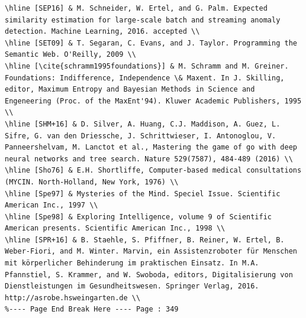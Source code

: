 \documentclass[10pt]{article}
\begin{document}
\begin{verbatim}
\hline [SEP16] & M. Schneider, W. Ertel, and G. Palm. Expected similarity estimation for large-scale batch and streaming anomaly detection. Machine Learning, 2016. accepted \\
\hline [SET09] & T. Segaran, C. Evans, and J. Taylor. Programming the Semantic Web. O'Reilly, 2009 \\
\hline [\cite{schramm1995foundations}] & M. Schramm and M. Greiner. Foundations: Indifference, Independence \& Maxent. In J. Skilling, editor, Maximum Entropy and Bayesian Methods in Science and Engeneering (Proc. of the MaxEnt'94). Kluwer Academic Publishers, 1995 \\
\hline [SHM+16] & D. Silver, A. Huang, C.J. Maddison, A. Guez, L. Sifre, G. van den Driessche, J. Schrittwieser, I. Antonoglou, V. Panneershelvam, M. Lanctot et al., Mastering the game of go with deep neural networks and tree search. Nature 529(7587), 484-489 (2016) \\
\hline [Sho76] & E.H. Shortliffe, Computer-based medical consultations (MYCIN. North-Holland, New York, 1976) \\
\hline [Spe97] & Mysteries of the Mind. Speciel Issue. Scientific American Inc., 1997 \\
\hline [Spe98] & Exploring Intelligence, volume 9 of Scientific American presents. Scientific American Inc., 1998 \\
\hline [SPR+16] & B. Staehle, S. Pfiffner, B. Reiner, W. Ertel, B. Weber-Fiori, and M. Winter. Marvin, ein Assistenzroboter für Menschen mit körperlicher Behinderung im praktischen Einsatz. In M.A. Pfannstiel, S. Krammer, and W. Swoboda, editors, Digitalisierung von Dienstleistungen im Gesundheitswesen. Springer Verlag, 2016. http://asrobe.hsweingarten.de \\
%---- Page End Break Here ---- Page : 349


\end{verbatim}
\end{document}
